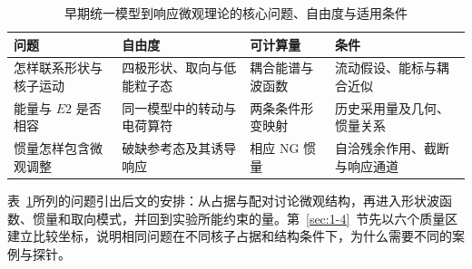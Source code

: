 \begin{table}[htbp]
\centering
\small
\caption{早期统一模型到响应微观理论的核心问题、自由度与适用条件}\label{tab:1-3-unified-to-response}
\begin{tabularx}{\textwidth}{p{3.5cm}p{3.5cm}p{3.5cm}X}
\toprule
问题 & 自由度 & 可计算量 & 条件 \\
\midrule
怎样联系形状与核子运动 & 四极形状、取向与低能粒子态 & 耦合能谱与波函数 & 流动假设、能标与耦合近似 \\
能量与 $E2$ 是否相容 & 同一模型中的转动与电荷算符 & 两条条件形变映射 & 历史采用量及几何、惯量关系 \\
惯量怎样包含微观调整 & 破缺参考态及其诱导响应 & 相应 NG 惯量 & 自洽残余作用、截断与响应通道 \\
\bottomrule
\end{tabularx}
\end{table}

表~\ref{tab:1-3-unified-to-response}所列的问题引出后文的安排：从占据与配对讨论微观结构，再进入形状波函数、惯量和取向模式，并回到实验所能约束的量。第~\ref{sec:1-4}~节先以六个质量区建立比较坐标，说明相同问题在不同核子占据和结构条件下，为什么需要不同的案例与探针。
